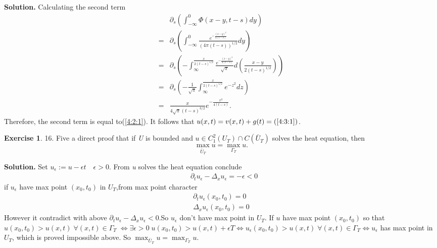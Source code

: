 \documentclass[a4paper]{book}
\newenvironment{solution}%
{\noindent\textbf{Solution.}}%
{\qedhere}
\numberwithin{equation}{chapter}
\theoremstyle{definition}
\newtheorem{exc}[exm]{Exercise}
\begin{document}
\begin{multicols}{2}
\begin{solution}
	Calculating the second term 
	\begin{align*}
	&\partial_s (\int_{-\infty}^{0} \Phi(x-y, t-s)dy) \\
	=&\partial_s (\int_{-\infty}^{0} \frac{e^{-\frac{(x-y)^2}{4(t-s)}}}{(4\pi (t-s))^{1/2}}dy) \\
	=&\partial_s (-\int_{\infty}^{\frac{x}{2(t-s)^{1/2}}} \frac{e^{-\frac{(x-y)^2}{4(t-s)}}}{\sqrt{\pi}}d(\frac{x-y}{2(t-s)^{1/2}}))\\
	=&\partial_s (-\frac{1}{\sqrt{\pi}} \int_{\infty}^{\frac{x}{2(t-s)^{1/2}}} e^{-z^2} dz) \\
	=&\frac{x}{4\sqrt{\pi}(t-s)^{3/2}} e^{-\frac{x^2}{4(t-s)}}.
	\end{align*}
	Therefore, the second term is equal to(\ref{4:2:1}). It follows that $ u(x,t) = v(x,t) + g(t) = (\ref{4:3:1}) $.
\end{solution}

\begin{exc}
	16.  Five a direct proof that if \textit{U} is bounded and  $ u \in C^2_1 (U_T) \cap C(\bar{U}_T) $ solves the heat equation, then 
	\begin{equation}\label{4:3:1}
		\max_{\bar{U}_T} u = \max_{\Gamma_T} u.
	\end{equation}
\end{exc}

\begin{solution}
	Set $ u_\epsilon := u - \epsilon t\quad \epsilon > 0$. From \textit{u} solves the heat equation conclude 
	\begin{align*}
		&\partial_t u_\epsilon - \Delta_x u_\epsilon =-\epsilon < 0 
	\end{align*}
	if $ u_\epsilon $ have max point $ (x_0,t_0) $ in $ U_T $,from max point character 
	\begin{align*}
		\partial_t u_\epsilon(x_0, t_0) = 0 \\
		\Delta_x u_\epsilon(x_0, t_0) = 0
	\end{align*}
	However it contradict with above $ \partial_t u_\epsilon - \Delta_x u_\epsilon < 0  $.So $ u_\epsilon $ don't have max point in $ U_T $. If $ u $ have max point $ (x_0, t_0) $ so that $ u(x_0, t_0) > u(x,t) \; \forall (x,t) \in \Gamma_T \; \Longleftrightarrow \exists \epsilon > 0 \; u(x_0, t_0) > u(x,t) + \epsilon T \Longleftrightarrow u_\epsilon(x_0,t_0) > u(x,t) \; \forall (x,t) \in \Gamma_T \Longleftrightarrow u_\epsilon$ has max point in $ U_T $, which is proved impossible above. So $ \max_{\bar{U}_T} u = \max_{\Gamma_T} u. $
\end{solution}


\end{multicols}
\end{document}
